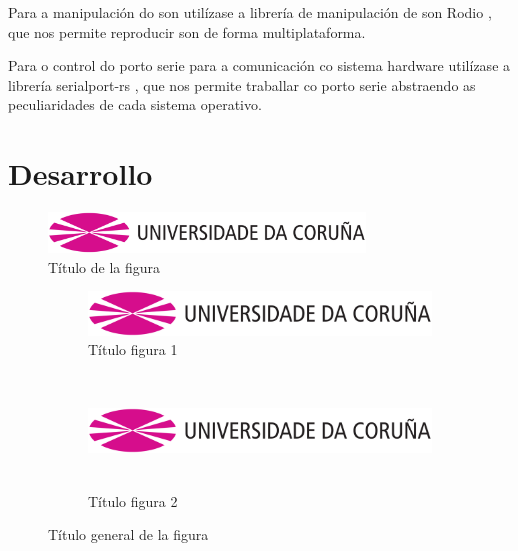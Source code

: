 Para a manipulación do son utilízase a librería de manipulación de son Rodio \cite{Rodio}, que nos permite reproducir son de forma multiplataforma.

Para o control do porto serie para a comunicación co sistema hardware utilízase a librería serialport-rs \cite{Serialport}, que nos permite traballar co porto serie abstraendo as peculiaridades de cada sistema operativo. 


\section{Desarrollo}



\begin{figure}[hp!]
  \centering
  \includegraphics[width=0.75\textwidth]{imaxes/udc.png}
  \caption{Título de la figura}
  \label{fig:exemplo}
\end{figure}

\begin{figure}[hp!]
  \centering
  \begin{subfigure}[c]{0.3\textwidth}
    \includegraphics[angle=45,width=\textwidth]{imaxes/udc.png}
    \caption{Título figura 1}
    \label{fig:subfigura-rotada}
  \end{subfigure}
  \hspace{0.1\textwidth}
  \begin{subfigure}[c]{0.3\textwidth}
    \includegraphics[width=\textwidth,height=3cm]{imaxes/udc.png}
    \caption{Título figura 2}
    \label{fig:subfigura-deformada}
  \end{subfigure}
  \caption{Título general de la figura}
  \label{fig:exemplo-subfiguras}
\end{figure}

